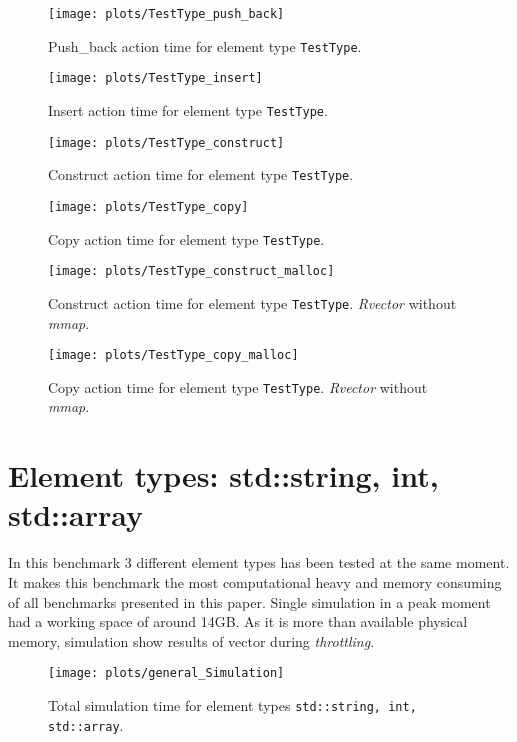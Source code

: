 \documentclass[inz, english, shortabstract]{iithesis}
\begin{document}
\begin{figure}[h!]
\texttt{[image: plots/TestType\_push\_back]}
\caption{Push\_back action time for element type \lstinline{TestType}.}
\label{TestType_push_back}
\end{figure}

\begin{figure}[h!]
\texttt{[image: plots/TestType\_insert]}
\caption{Insert action time for element type \lstinline{TestType}.}
\label{TestType_insert}
\end{figure}

\begin{figure}[h!]
\texttt{[image: plots/TestType\_construct]}
\caption{Construct action time for element type \lstinline{TestType}.}
\label{TestType_construct}
\end{figure}

\begin{figure}[h!]
\texttt{[image: plots/TestType\_copy]}
\caption{Copy action time for element type \lstinline{TestType}.}
\label{TestType_copy}
\end{figure}


\begin{figure}[h!]
\texttt{[image: plots/TestType\_construct\_malloc]}
\caption{Construct action time for element type \lstinline{TestType}. {\it Rvector} without {\it mmap}.}
\label{TestType_construct_malloc}
\end{figure}

\begin{figure}[h!]
\texttt{[image: plots/TestType\_copy\_malloc]}
\caption{Copy action time for element type \lstinline{TestType}. {\it Rvector} without {\it mmap}.}
\label{TestType_copy_malloc}
\end{figure}

\section{Element types: std::string, int, std::array}
In this benchmark 3 different element types has been tested at the same moment. It makes this benchmark the most computational heavy and memory consuming of all benchmarks presented in this paper. Single simulation in a peak moment had a working space of around 14GB. As it is more than available physical memory,  simulation show results of vector during {\it throttling}.

\begin{figure}[h!]
\texttt{[image: plots/general\_Simulation]}
\caption{Total simulation time for element types \lstinline{std::string, int, std::array}.}
\label{general_simulation}
\end{figure}
\end{document}
